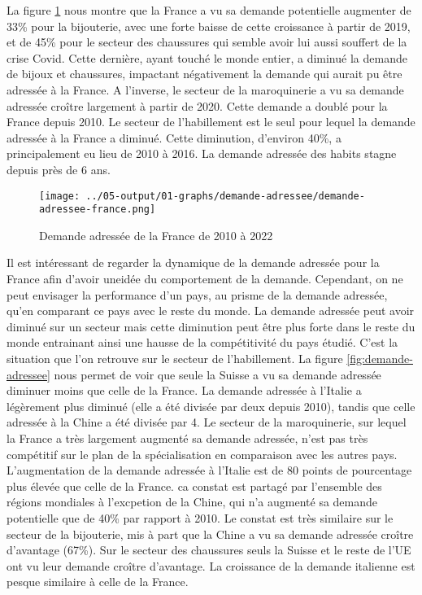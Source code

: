 \documentclass[french,10pt,a4paper]{article}
\begin{document}
La figure \ref{fig:demande-adressee-france} nous montre que la France a vu sa demande potentielle augmenter de 33\% pour la bijouterie, avec une forte baisse de cette croissance à partir de 2019, et de 45\% pour le secteur des chaussures qui semble avoir lui aussi souffert de la crise Covid. Cette dernière, ayant touché le monde entier, a diminué la demande de bijoux et chaussures, impactant négativement la demande qui aurait pu être adressée à la France. A l'inverse, le secteur de la maroquinerie a vu sa demande adressée croître largement à partir de 2020. Cette demande a doublé pour la France depuis 2010. Le secteur de l'habillement est le seul pour lequel la demande adressée à la France a diminué. Cette diminution, d'environ 40\%, a principalement eu lieu de 2010 à 2016. La demande adressée des habits stagne depuis près de 6 ans.

\begin{figure}[!h]
  \centering  \texttt{[image: ../05-output/01-graphs/demande-adressee/demande-adressee-france.png]}
  \caption{Demande adressée de la France de 2010 à 2022}
  \label{fig:demande-adressee-france}
\end{figure}

Il est intéressant de regarder la dynamique de la demande adressée pour la France afin d'avoir uneidée du comportement de la demande. Cependant, on ne peut envisager la performance d'un pays, au prisme de la demande adressée, qu'en comparant ce pays avec le reste du monde. La demande adressée peut avoir diminué sur un secteur mais cette diminution peut être plus forte dans le reste du monde entrainant ainsi une hausse de la compétitivité du pays étudié. C'est la situation que l'on retrouve sur le secteur de l'habillement. La figure \ref{fig:demande-adressee} nous permet de voir que seule la Suisse a vu sa demande adressée diminuer moins que celle de la France. La demande adressée à l'Italie a légèrement plus diminué (elle a été divisée par deux depuis 2010), tandis que celle adressée à la Chine a été divisée par 4. Le secteur de la maroquinerie, sur lequel la France a très largement augmenté sa demande adressée, n'est pas très compétitif sur le plan de la spécialisation en comparaison avec les autres pays. L'augmentation de la demande adressée à l'Italie est de 80 points de pourcentage plus élevée que celle de la France. ca constat est partagé par l'ensemble des régions mondiales à l'excpetion de la Chine, qui n'a augmenté sa demande potentielle que de 40\% par rapport à 2010. Le constat est très similaire sur le secteur de la bijouterie, mis à part que la Chine a vu sa demande adressée croître d'avantage (67\%). Sur le secteur des chaussures seuls la Suisse et le reste de l'UE ont vu leur demande croître d'avantage. La croissance de la demande italienne est pesque similaire à celle de la France.
\end{document}
